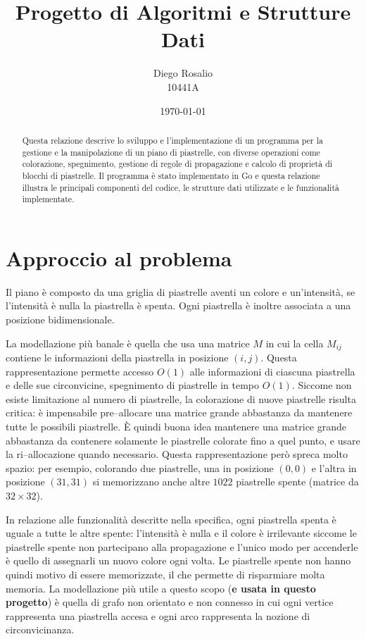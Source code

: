 \documentclass[a4paper,12pt]{article}
\title{Progetto di Algoritmi e Strutture Dati}
\author{Diego Rosalio \\ 10441A}
\date{\today}
\begin{document}
	\maketitle
	\begin{abstract}
		Questa relazione descrive lo sviluppo e l'implementazione di un programma per la gestione e la manipolazione di un piano di piastrelle, con diverse operazioni come colorazione, spegnimento, gestione di regole di propagazione e calcolo di proprietà di blocchi di piastrelle. Il programma è stato implementato in Go e questa relazione illustra le principali componenti del codice, le strutture dati utilizzate e le funzionalità implementate.
	\end{abstract}
	
	\section{Approccio al problema}
	Il piano è composto da una griglia di piastrelle aventi un colore e un'intensità, se l'intensità è nulla la piastrella è spenta.
	Ogni piastrella è inoltre associata a una posizione bidimensionale.
	
	La modellazione più banale è quella che usa una matrice \(M\) in cui la cella \(M_{ij}\) contiene le informazioni della piastrella in posizione \((i, j)\).
	Questa rappresentazione permette accesso \(O(1)\) alle informazioni di ciascuna piastrella e delle sue circonvicine, spegnimento di piastrelle in tempo \(O(1)\).
	Siccome non esiste limitazione al numero di piastrelle, la colorazione di nuove piastrelle risulta critica: è impensabile pre--allocare una matrice grande abbastanza da mantenere tutte le possibili piastrelle.
	È quindi buona idea mantenere una matrice grande abbastanza da contenere solamente le piastrelle colorate fino a quel punto, e usare la ri--allocazione quando necessario.
	Questa rappresentazione però spreca molto spazio: per esempio, colorando due piastrelle, una in posizione \((0, 0)\) e l'altra in posizione \((31, 31)\) si memorizzano anche altre \(1022\) piastrelle spente (matrice da \(32 \times 32\)).
	
	In relazione alle funzionalità descritte nella specifica, ogni piastrella spenta è uguale a tutte le altre spente: l'intensità è nulla e il colore è irrilevante siccome le piastrelle spente non partecipano alla propagazione e l'unico modo per accenderle è quello di assegnarli un nuovo colore ogni volta.
	Le piastrelle spente non hanno quindi motivo di essere memorizzate, il che permette di risparmiare  molta memoria.
	La modellazione più utile a questo scopo (\textbf{e usata in questo progetto}) è quella di grafo non orientato e non connesso in cui ogni vertice rappresenta una piastrella accesa e ogni arco rappresenta la nozione di circonvicinanza.
	
\end{document}
